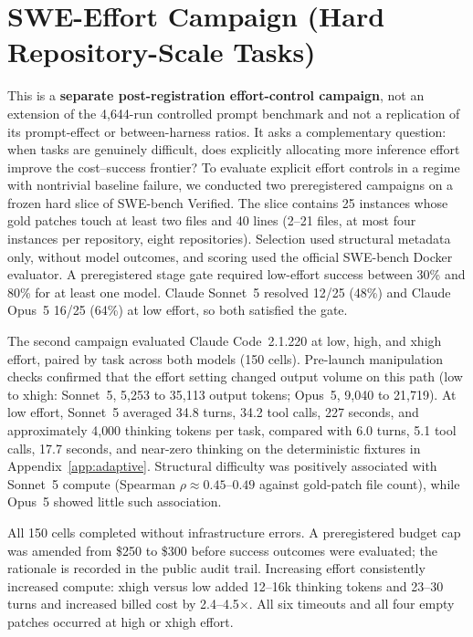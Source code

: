 \documentclass[11pt]{article}
\newcommand{\cc}{Claude Code}
\newcommand{\xd}{$\times$}
\begin{document}
\section{SWE-Effort Campaign (Hard Repository-Scale Tasks)}
\label{app:swe-effort}
This is a \textbf{separate post-registration effort-control campaign}, not an
extension of the 4{,}644-run controlled prompt benchmark and not a replication
of its prompt-effect or between-harness ratios. It asks a complementary
question: when tasks are genuinely difficult, does explicitly allocating more
inference effort improve the cost--success frontier? To evaluate explicit
effort controls in a regime with nontrivial baseline failure, we conducted two
preregistered campaigns on a frozen hard slice of SWE-bench Verified. The slice contains 25 instances whose gold patches touch
at least two files and 40 lines (2--21 files, at most four instances per
repository, eight repositories). Selection used structural metadata only,
without model outcomes, and scoring used the official SWE-bench Docker
evaluator. A preregistered stage gate required low-effort success between
30\% and 80\% for at least one model. Claude Sonnet~5 resolved 12/25 (48\%)
and Claude Opus~5 16/25 (64\%) at low effort, so both satisfied the gate.

The second campaign evaluated \cc{}~2.1.220 at low, high, and xhigh effort,
paired by task across both models (150 cells). Pre-launch manipulation checks
confirmed that the effort setting changed output volume on this path
(low to xhigh: Sonnet~5, 5{,}253 to 35{,}113 output tokens; Opus~5, 9{,}040
to 21{,}719). At low effort, Sonnet~5 averaged 34.8 turns, 34.2 tool calls,
227 seconds, and approximately 4{,}000 thinking tokens per task, compared
with 6.0 turns, 5.1 tool calls, 17.7 seconds, and near-zero thinking on the
deterministic fixtures in Appendix~\ref{app:adaptive}. Structural difficulty
was positively associated with Sonnet~5 compute (Spearman
$\rho\approx0.45$--$0.49$ against gold-patch file count), while Opus~5 showed
little such association.

All 150 cells completed without infrastructure errors. A preregistered budget
cap was amended from \$250 to \$300 before success outcomes were evaluated;
the rationale is recorded in the public audit trail. Increasing effort
consistently increased compute: xhigh versus low added 12--16k thinking
tokens and 23--30 turns and increased billed cost by 2.4--4.5\xd{}. All six
timeouts and all four empty patches occurred at high or xhigh effort.
\end{document}
